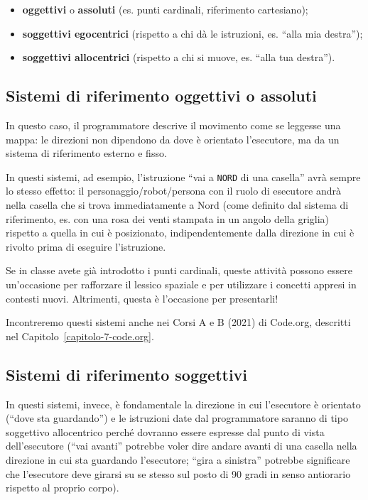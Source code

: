 \begin{itemize}
\item
  \textbf{oggettivi} o \textbf{assoluti} (es. punti cardinali, riferimento cartesiano);
\item
  \textbf{soggettivi egocentrici} (rispetto a chi dà le istruzioni, es. ``alla mia destra'');
\item
  \textbf{soggettivi allocentrici} (rispetto a chi si muove, es. ``alla tua destra'').
\end{itemize}

\subsection{Sistemi di riferimento oggettivi o assoluti }\label{sistemi-di-riferimento-oggettivi-o-assoluti}

In questo caso, il programmatore descrive il movimento come se leggesse una mappa: le direzioni non dipendono da dove è orientato l'esecutore, ma da un sistema di riferimento esterno e fisso.

In questi sistemi, ad esempio, l'istruzione ``vai a \texttt{NORD} di una casella'' avrà sempre lo stesso effetto: il personaggio/robot/persona con il ruolo di esecutore andrà nella casella che si trova immediatamente a Nord (come definito dal sistema di riferimento, es. con una rosa dei venti stampata in un angolo della griglia) rispetto a quella in cui è posizionato, indipendentemente dalla direzione in cui è rivolto prima di eseguire l'istruzione.

Se in classe avete già introdotto i punti cardinali, queste attività possono essere un'occasione per rafforzare il lessico spaziale e per utilizzare i concetti appresi in contesti nuovi. Altrimenti, questa è l'occasione per presentarli!

Incontreremo questi sistemi anche nei Corsi A e B (2021) di Code.org, descritti nel Capitolo~\ref{capitolo-7-code.org}.

\subsection{Sistemi di riferimento soggettivi }\label{sistemi-di-riferimento-soggettivi}

In questi sistemi, invece, è fondamentale la direzione in cui l'esecutore è orientato (``dove sta guardando'') e le istruzioni date dal programmatore saranno di tipo soggettivo allocentrico perché dovranno essere espresse dal punto di vista dell'esecutore (``vai avanti'' potrebbe voler dire andare avanti di una casella nella direzione in cui sta guardando l'esecutore; ``gira a sinistra'' potrebbe significare che l'esecutore deve girarsi su se stesso sul posto di 90 gradi in senso antiorario rispetto al proprio corpo).


